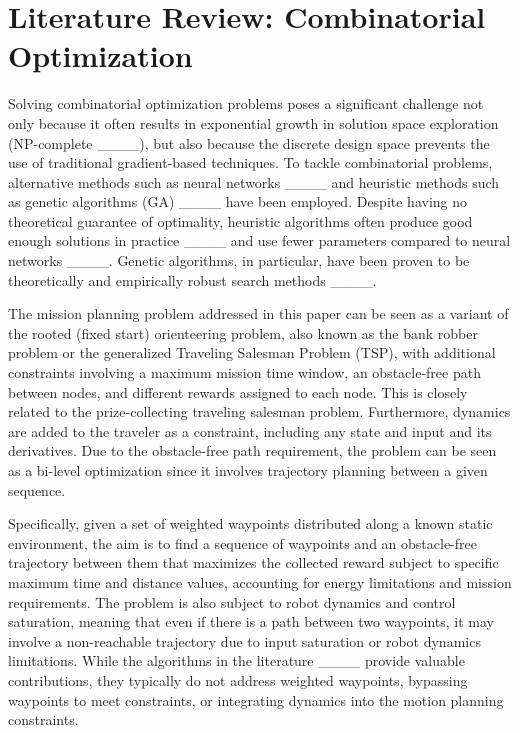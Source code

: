 \section{Literature Review: Combinatorial Optimization}
Solving combinatorial optimization problems poses a significant challenge not only because it often results in exponential growth in solution space exploration (NP-complete ____), but also because the discrete design space prevents the use of traditional gradient-based techniques. To tackle combinatorial problems, alternative methods such as neural networks ____ and heuristic methods such as genetic algorithms (GA) ____ have been employed.
Despite having no theoretical guarantee of optimality, heuristic algorithms often produce good enough solutions in practice ____ and use fewer parameters compared to neural networks ____. Genetic algorithms, in particular, have been proven to be theoretically and empirically robust search methods ____.



The mission planning problem addressed in this paper can be seen as a variant of the rooted (fixed start) orienteering problem, also known as the bank robber problem or the generalized Traveling Salesman Problem (TSP), with additional constraints involving a maximum mission time window, an obstacle-free path between nodes, and different rewards assigned to each node. This is closely related to the prize-collecting traveling salesman problem. Furthermore, dynamics are added to the traveler as a constraint, including any state and input and its derivatives. Due to the obstacle-free path requirement, the problem can be seen as a bi-level optimization since it involves trajectory planning between a given sequence.

Specifically, given a set of weighted waypoints distributed along a known static environment, the aim is to find a sequence of waypoints and an obstacle-free trajectory between them that maximizes the collected reward subject to specific maximum time and distance values, accounting for energy limitations and mission requirements. The problem is also subject to robot dynamics and control saturation, meaning that even if there is a path between two waypoints, it may involve a non-reachable trajectory due to input saturation or robot dynamics limitations. While the algorithms in the literature ____ provide valuable contributions, they typically do not address weighted waypoints, bypassing waypoints to meet constraints, or integrating dynamics into the motion planning constraints.

